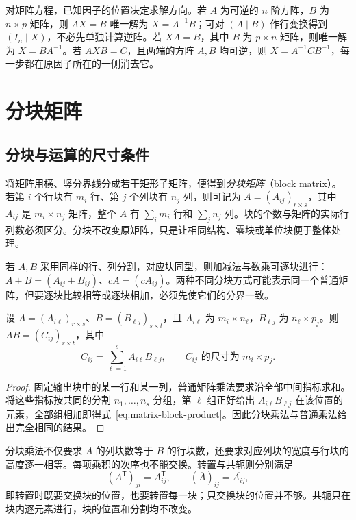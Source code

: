对矩阵方程，已知因子的位置决定求解方向。若 $A$ 为可逆的 $n$ 阶方阵，$B$ 为 $n\times p$ 矩阵，则 $AX=B$ 唯一解为 $X=A^{-1}B$；可对 $(A\mid B)$ 作行变换得到 $(I_n\mid X)$，不必先单独计算逆阵。若 $XA=B$，其中 $B$ 为 $p\times n$ 矩阵，则唯一解为 $X=BA^{-1}$。若 $AXB=C$，且两端的方阵 $A,B$ 均可逆，则 $X=A^{-1}CB^{-1}$，每一步都在原因子所在的一侧消去它。

\section{分块矩阵}
\label{sec:matrix-blocks}

\subsection{分块与运算的尺寸条件}

将矩阵用横、竖分界线分成若干矩形子矩阵，便得到\emph{分块矩阵}（block matrix）。若第 $i$ 个行块有 $m_i$ 行、第 $j$ 个列块有 $n_j$ 列，则可记为 $A=(A_{ij})_{r\times s}$，其中 $A_{ij}$ 是 $m_i\times n_j$ 矩阵，整个 $A$ 有 $\sum_i m_i$ 行和 $\sum_j n_j$ 列。块的个数与矩阵的实际行列数必须区分。分块不改变原矩阵，只是让相同结构、零块或单位块便于整体处理。

若 $A,B$ 采用同样的行、列分割，对应块同型，则加减法与数乘可逐块进行：$A\pm B=(A_{ij}\pm B_{ij})$、$cA=(cA_{ij})$。两种不同分块方式可能表示同一个普通矩阵，但要逐块比较相等或逐块相加，必须先使它们的分界一致。

\begin{proposition}[分块乘法]
\label{prop:matrix-block-product}
设 $A=(A_{i\ell})_{r\times s}$、$B=(B_{\ell j})_{s\times t}$，且 $A_{i\ell}$ 为 $m_i\times n_\ell$，$B_{\ell j}$ 为 $n_\ell\times p_j$。则 $AB=(C_{ij})_{r\times t}$，其中
\begin{equation}
\label{eq:matrix-block-product}
    C_{ij}=\sum_{\ell=1}^{s}A_{i\ell}B_{\ell j},
    \qquad C_{ij}\text{ 的尺寸为 }m_i\times p_j.
\end{equation}
\end{proposition}

\begin{proof}
固定输出块中的某一行和某一列，普通矩阵乘法要求沿全部中间指标求和。将这些指标按共同的分割 $n_1,\ldots,n_s$ 分组，第 $\ell$ 组正好给出 $A_{i\ell}B_{\ell j}$ 在该位置的元素，全部组相加即得式~\eqref{eq:matrix-block-product}。因此分块乘法与普通乘法给出完全相同的结果。
\end{proof}

分块乘法不仅要求 $A$ 的列块数等于 $B$ 的行块数，还要求对应列块的宽度与行块的高度逐一相等。每项乘积的次序也不能交换。转置与共轭则分别满足
\[
    (A^{\mathsf T})_{ji}=A_{ij}^{\mathsf T},\qquad
    (\overline A)_{ij}=\overline{A_{ij}},
\]
即转置时既要交换块的位置，也要转置每一块；只交换块的位置并不够。共轭只在块内逐元素进行，块的位置和分割均不改变。

